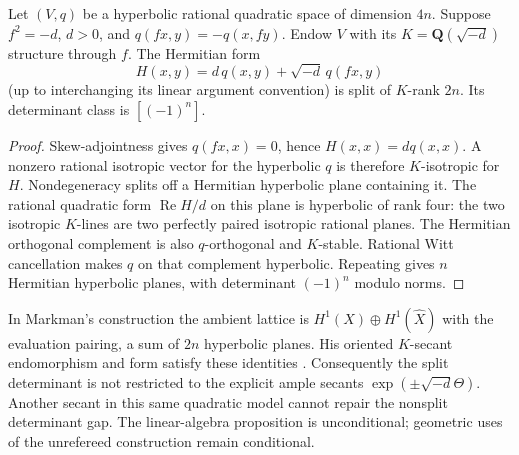 \begin{proposition}
\label{SF-CM04}
Let $(V,q)$ be a hyperbolic rational quadratic space of dimension
$4n$. Suppose $f^2=-d$, $d>0$, and
$q(fx,y)=-q(x,fy)$. Endow $V$ with its
$K=\mathbf Q(\sqrt{-d})$ structure through $f$. The Hermitian form
\[
 H(x,y)=d\,q(x,y)+\sqrt{-d}\,q(fx,y)
\]
(up to interchanging its linear argument convention) is split of
$K$-rank $2n$. Its determinant class is $[(-1)^n]$.
\end{proposition}
\begin{proof}
Skew-adjointness gives $q(fx,x)=0$, hence $H(x,x)=dq(x,x)$.
A nonzero rational isotropic vector for the hyperbolic $q$ is
therefore $K$-isotropic for $H$. Nondegeneracy splits off a
Hermitian hyperbolic plane containing it. The rational quadratic
form $\operatorname{Re}H/d$ on this plane is hyperbolic of rank
four: the two isotropic $K$-lines are two perfectly paired isotropic
rational planes. The Hermitian orthogonal complement is also
$q$-orthogonal and $K$-stable. Rational Witt cancellation makes
$q$ on that complement hyperbolic. Repeating gives $n$ Hermitian
hyperbolic planes, with determinant $(-1)^n$ modulo norms.
\end{proof}
In Markman's construction the ambient lattice is
$H^1(X)\oplus H^1(\widehat X)$ with the evaluation pairing, a sum
of $2n$ hyperbolic planes. His oriented $K$-secant endomorphism
and form satisfy these identities
\cite[\S3.1, equation~(3.1.2) and Lemma~3.1.2, pp.~22--23]{SF-Markman2502}.
Consequently the split determinant is not restricted to the explicit
ample secants $\exp(\pm\sqrt{-d}\Theta)$. Another secant in this
same quadratic model cannot repair the nonsplit determinant gap.
The linear-algebra proposition is unconditional; geometric uses of
the unrefereed construction remain conditional.

